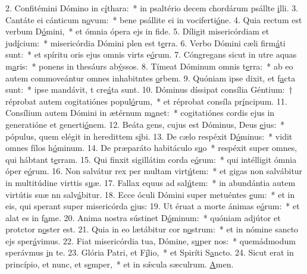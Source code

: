 2. Confitémini Dómino in c\uline{í}thara:~* in psaltério decem chordárum psállte \uline{i}lli.
3. Cantáte ei cánticum n\uline{o}vum:~* bene psállite ei in vociferti\uline{ó}ne.
4. Quia rectum est verbum D\uline{ó}mini,~* et ómnia ópera ejs in f\uline{i}de.
5. Díligit misericórdiam et jud\uline{í}cium:~* misericórdia Dómini plen est t\uline{e}rra.
6. Verbo Dómini cæli firm\uline{á}ti sunt:~* et spíritu oris ejus omnis virts e\uline{ó}rum.
7. Cóngregans sicut in utre aquas m\uline{a}ris:~* ponens in thesáurs ab\uline{ý}ssos.
8. Tímeat Dóminum omnis t\uline{e}rra:~* ab eo autem commoveántur omnes inhabitntes \uline{o}rbem.
9. Quóniam ipse dixit, et f\uline{a}cta sunt:~* ipse mandávit, t cre\uline{á}ta sunt.
10. Dóminus díssipat consília Géntium:~† réprobat autem cogitatiónes popul\uline{ó}rum,~* et réprobat consíla pr\uline{í}ncipum.
11. Consílium autem Dómini in ætérnum m\uline{a}net:~* cogitatiónes cordis ejus in generatióne et generti\uline{ó}nem.
12. Beáta gens, cujus est Dóminus, Deus \uline{e}jus:~* pópulus, quem elégit in heredittem s\uline{i}bi.
13. De cælo respéxit D\uline{ó}minus:~* vidit omnes fílos h\uline{ó}minum.
14. De præparáto habitáculo s\uline{u}o~* respéxit super omnes, qui hábtant t\uline{e}rram.
15. Qui finxit sigillátim corda e\uline{ó}rum:~* qui intélligit ómnia óper e\uline{ó}rum.
16. Non salvátur rex per multam virt\uline{ú}tem:~* et gigas non salvábitur in multitúdine virttis s\uline{u}æ.
17. Fallax equus ad sal\uline{ú}tem:~* in abundántia autem virtútis suæ nn salv\uline{á}bitur.
18. Ecce óculi Dómini super metuéntes \uline{e}um:~* et in eis, qui sperant super misericórda \uline{e}jus:
19. Ut éruat a morte ánimas e\uline{ó}rum:~* et alat es in f\uline{a}me.
20. Anima nostra sústinet D\uline{ó}minum:~* quóniam adjútor et protctor n\uline{o}ster est.
21. Quia in eo lætábitur cor n\uline{o}strum:~* et in nómine sancto ejs sper\uline{á}vimus.
22. Fiat misericórdia tua, Dómine, s\uline{u}per nos:~* quemádmodum sperávmus \uline{i}n te.
23. Glória Patri, et F\uline{í}lio,~* et Spiríti S\uline{a}ncto.
24. Sicut erat in princípio, et nunc, et s\uline{e}mper,~* et in sǽcula sæculrum. \uline{A}men.
